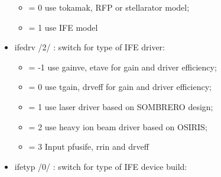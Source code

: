 \documentclass[]{article}
\providecommand{\tightlist}{%
  \setlength{\itemsep}{0pt}\setlength{\parskip}{0pt}}
\begin{document}
\begin{itemize}
  \begin{itemize}
  \tightlist
  \item
    = 0 use tokamak, RFP or stellarator model;
  \item
    = 1 use IFE model
  \end{itemize}
\item
  ifedrv /2/ : switch for type of IFE driver:

  \begin{itemize}
  \tightlist
  \item
    = -1 use gainve, etave for gain and driver efficiency;
  \item
    = 0 use tgain, drveff for gain and driver efficiency;
  \item
    = 1 use laser driver based on SOMBRERO design;
  \item
    = 2 use heavy ion beam driver based on OSIRIS;
  \item
    = 3 Input pfusife, rrin and drveff
  \end{itemize}
\item
  ifetyp /0/ : switch for type of IFE device build:


\end{itemize}
\end{document}
